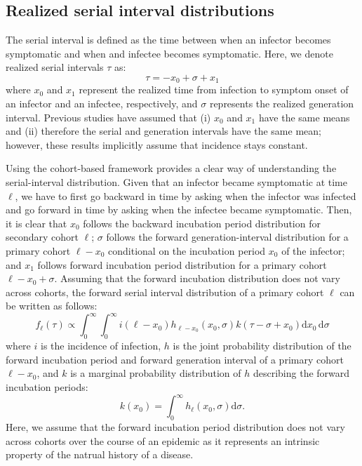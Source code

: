 \documentclass[12pt]{article}
\begin{document}
\subsection{Realized serial interval distributions}

The serial interval is defined as the time between when an infector becomes symptomatic and when and infectee becomes symptomatic.
Here, we denote realized serial intervals $\tau$ as:
\begin{equation}
\tau = - x_0 + \sigma + x_1
\end{equation}
where $x_0$ and $x_1$ represent the realized time from infection to symptom onset of an infector and an infectee, respectively, and $\sigma$ represents the realized generation interval.
Previous studies have assumed that (i) $x_0$ and $x_1$ have the same means and (ii) therefore the serial and generation intervals have the same mean;
however, these results implicitly assume that incidence stays constant.

Using the cohort-based framework provides a clear way of understanding the serial-interval distribution.
Given that an infector became symptomatic at time $\ell$, we have to first go backward in time by asking when the infector was infected and go forward in time by asking when the infectee became symptomatic.
Then, it is clear that $x_0$ follows the backward incubation period distribution for secondary cohort $\ell$; 
$\sigma$ follows the forward generation-interval distribution for a primary cohort $\ell - x_0$ conditional on the incubation period $x_0$ of the infector;
and $x_1$ follows forward incubation period distribution for a primary cohort $\ell - x_0 + \sigma$.
Assuming that the forward incubation distribution does not vary across cohorts, the forward serial interval distribution of a primary cohort $\ell$ can be written as follows:
\begin{equation}
f_\ell(\tau) \propto \int_{0}^\infty \int_{0}^\infty i(\ell - x_0) h_{\ell - x_0}(x_0, \sigma) k(\tau-\sigma+x_0) \mathrm{d} x_0\, \mathrm{d}\sigma
\end{equation}
where $i$ is the incidence of infection, $h$ is the joint probability distribution of the forward incubation period and forward generation interval of a primary cohort $\ell - x_0$, and $k$ is a marginal probability distribution of $h$ describing the forward incubation periods:
\begin{equation}
k(x_0) = \int_0^\infty h_\ell(x_0, \sigma) \mathrm{d}\sigma.
\end{equation}
Here, we assume that the forward incubation period distribution does not vary across cohorts over the course of an epidemic as it represents an intrinsic property of the natrual history of a disease.
\end{document}
